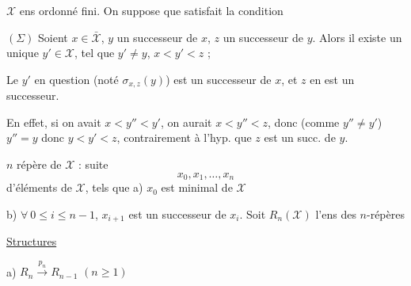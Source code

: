 $\mathcal X$ ens ordonné fini. On suppose que  satisfait la condition

$(\Sigma)$ Soient $x\in\bar{\mathcal X}$, $y$ un successeur de $x$, $z$ un successeur de $y$. Alors il existe un unique $y'\in \mathcal X$, tel que $y'\ne y$, $x<y'<z$ ; 

Le $y'$ en question (noté $\sigma_{x,z}(y)$) est un successeur de $x$, et $z$ en est un successeur.

\diagram{\begin{tikzcd}[ampersand replacement=\&,row sep=tiny,column sep=tiny]
\&\deleted{\bullet}\arrow[dr]\&\\
\&\&\deleted{\bullet}\arrow[dr]\\
\deleted{\bullet}\arrow[uur]\arrow[r]\&\deleted{\bullet}\arrow[rr]\&\&\deleted{\bullet}
\end{tikzcd}}

En effet, si on avait  $x<y''<y'$, on aurait $x<y''<z$, donc (comme $y''\ne y'$) $y''=y$ donc $y<y'<z$, contrairement à l'hyp. que $z$ est un succ. de $y$.


$n$ répère de $\mathcal X$  : suite
\[
x_0,x_1,\ldots,x_n
\]
d'éléments de $\mathcal X$, tels que a) $x_0$ est minimal de $\mathcal X$

b) $\forall\ 0\le i\le n-1$, $x_{i+1}$ est un successeur de $x_i$. Soit $R_n(\mathcal X)$ l'ens des $n$-répères

\uline{Structures}

a) $R_n\xrightarrow{p_n}R_{n-1}$ \qquad $(n\ge1)$

